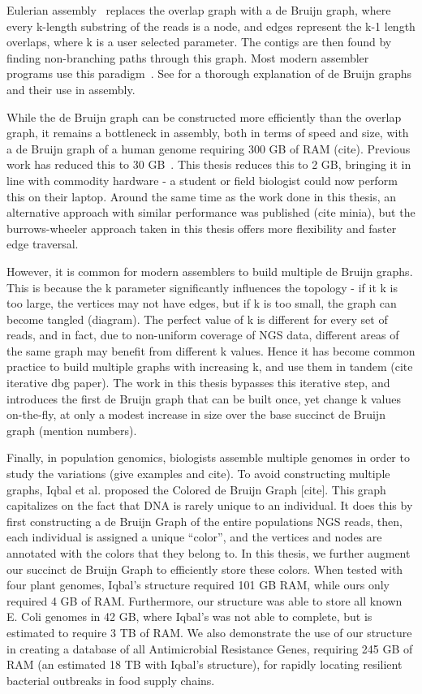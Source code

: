 Eulerian assembly~\cite{IW95, PTW} replaces the overlap graph with a de Bruijn graph, where every k-length substring of the reads is a node, and edges represent the k-1 length overlaps, where k is a user selected parameter. The contigs are then found by finding non-branching paths through this graph. Most modern assembler programs use this paradigm~\cite{bankevich2012spades,peng2010idba,Li:2010,Simpson:2009,Butler:2008,Zerbino:2008,SahShi12,MacPrz09}. See \cite{compeau11} for a thorough explanation of de Bruijn graphs and their use in assembly.

While the de Bruijn graph can be constructed more efficiently than the overlap graph, it remains a bottleneck in assembly, both in terms of speed and size, with a de Bruijn graph of a human genome requiring 300 GB of RAM (cite). Previous work has reduced this to 30 GB~\cite{Conway}. This thesis reduces this to 2 GB, bringing it in line with commodity hardware - a student or field biologist could now perform this on their laptop. Around the same time as the work done in this thesis, an alternative approach with similar performance was published (cite minia), but the burrows-wheeler approach taken in this thesis offers more flexibility and faster edge traversal.

However, it is common for modern assemblers to build multiple de Bruijn graphs. This is because the k parameter significantly influences the topology - if it k is too large, the vertices may not have edges, but if k is too small, the graph can become tangled (diagram). The perfect value of k is different for every set of reads, and in fact, due to non-uniform coverage of NGS data, different areas of the same graph may benefit from different k values. Hence it has become common practice to build multiple graphs with increasing k, and use them in tandem (cite iterative dbg paper). The work in this thesis bypasses this iterative step, and introduces the first de Bruijn graph that can be built once, yet change k values on-the-fly, at only a modest increase in size over the base succinct de Bruijn graph (mention numbers).

Finally, in population genomics, biologists assemble multiple genomes in order to study the variations (give examples and cite). To avoid constructing multiple graphs, Iqbal et al. proposed the Colored de Bruijn Graph [cite]. This graph capitalizes on the fact that DNA is rarely unique to an individual. It does this by first constructing a de Bruijn Graph of the entire populations NGS reads, then, each individual is assigned a unique “color”, and the vertices and nodes are annotated with the colors that they belong to. In this thesis, we further augment our succinct de Bruijn Graph to efficiently store these colors. When tested with four plant genomes, Iqbal’s structure required 101 GB RAM, while ours only required 4 GB of RAM. Furthermore, our structure was able to store all known E. Coli genomes in 42 GB, where Iqbal’s was not able to complete, but is estimated to require 3 TB of RAM. We also demonstrate the use of our structure in creating a database of all Antimicrobial Resistance Genes, requiring 245 GB of RAM (an estimated 18 TB with Iqbal’s structure), for rapidly locating resilient bacterial outbreaks in food supply chains.

